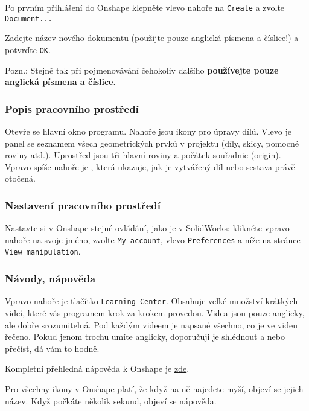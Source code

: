  Po prvním přihlášení do Onshape klepněte vlevo nahoře na {\tt Create} a zvolte {\tt Document...} 

Zadejte název nového dokumentu (použijte pouze anglická písmena a číslice!) a potvrďte {\tt OK}.  

Pozn.: Stejně tak při pojmenovávání čehokoliv dalšího \textbf{používejte pouze anglická písmena a číslice}.

\subsubsection{Popis pracovního prostředí}

Otevře se hlavní okno programu. 
Nahoře jsou ikony pro úpravy dílů. 
Vlevo je panel se seznamem všech geometrických prvků v projektu (díly, skicy, pomocné roviny atd.). 
Uprostřed jsou tři hlavní roviny a počátek souřadnic (origin). 
Vpravo spíše nahoře je , která ukazuje, jak je vytvářený díl nebo sestava právě otočená. 

\subsubsection{Nastavení pracovního prostředí}

Nastavte si v Onshape stejné ovládání, jako je v SolidWorks: 
klikněte vpravo nahoře na svoje jméno, zvolte \texttt{My account}, vlevo \texttt{Preferences} a níže na stránce \texttt{View manipulation}.  


\subsubsection{Návody, nápověda}

Vpravo nahoře je tlačítko {\tt Learning Center}. Obsahuje velké množství krátkých videí, které vás programem krok za krokem provedou. 
\href{https://learn.onshape.com/courses/fundamentals-navigating-onshape}{Videa} jsou pouze anglicky, ale dobře srozumitelná. Pod každým videem je napsané všechno, co je ve videu řečeno. Pokud jenom trochu umíte anglicky, doporučuji je shlédnout a nebo přečíst, dá vám to hodně. 

Kompletní přehledná nápověda k Onshape je  \href{https://cad.onshape.com/help/Content/gettingstarted.htm?tocpath=Desktop\%20Help\%7C_____3}{zde}.

Pro všechny ikony v Onshape platí, že když na ně najedete myší, objeví se jejich název. 
Když počkáte několik sekund, objeví se nápověda. 


